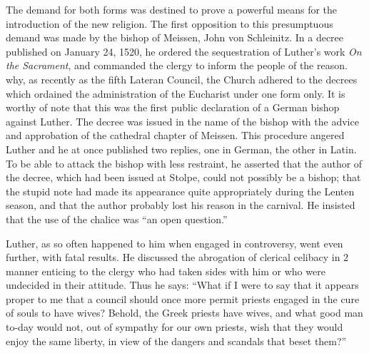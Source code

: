 The demand for both forms was destined to prove a powerful
means for the introduction of the new religion.
The first opposition to this presumptuous demand was made by
the bishop of Meissen, John von Schleinitz. In a decree published on
January 24, 1520, he ordered the sequestration of Luther’s work
\textit{On the Sacrament}, and commanded the clergy to inform the people
of the reason. why, as recently as the fifth Lateran Council, the
Church adhered to the decrees which ordained the administration of
the Eucharist under one form only. It is worthy of note that this
was the first public declaration of a German bishop against Luther.
The decree was issued in the name of the bishop with the advice
and approbation of the cathedral chapter of Meissen. This procedure
angered Luther and he at once published two replies, one in German, the
other in Latin. To be able to attack the bishop with less
restraint, he asserted that the author of the decree, which had been
issued at Stolpe, could not possibly be a bishop; that the stupid note
had made its appearance quite appropriately during the Lenten
season, and that the author probably lost his reason in the carnival.
He insisted that the use of the chalice was “an open question.”

Luther, as so often happened to him when engaged in controversy,
went even further, with fatal results. He discussed the abrogation of
clerical celibacy in 2 manner enticing to the clergy who had taken
sides with him or who were undecided in their attitude. Thus he
says: “What if I were to say that it appears proper to me that a
council should once more permit priests engaged in the cure of souls
to have wives? Behold, the Greek priests have wives, and what good
man to-day would not, out of sympathy for our own priests, wish
that they would enjoy the same liberty, in view of the dangers and
scandals that beset them?”

